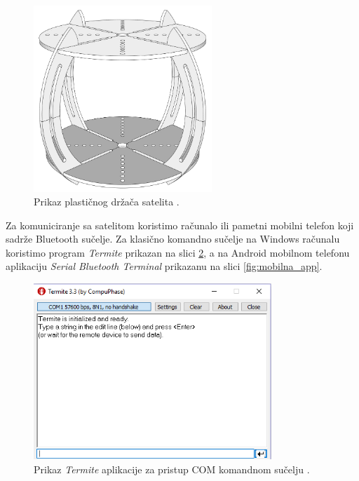 \documentclass[times, utf8, diplomski, numeric]{templates/template}
\begin{document}
{{        \begin{figure}[htb]
        \centering
        \includegraphics[width=0.6\textwidth]{images/drzac.png}
        \caption{Prikaz plastičnog držača satelita \cite{zracni_lezaj}.}
        \label{fig:drzac}
        \end{figure}

        Za komuniciranje sa satelitom koristimo računalo ili pametni mobilni telefon koji sadrže Bluetooth sučelje. Za klasično komandno sučelje na Windows računalu koristimo program \emph{Termite} \cite{termite} prikazan na slici \ref{fig:termite}, a na Android mobilnom telefonu aplikaciju \emph{Serial Bluetooth Terminal} \cite{mobilna_app} prikazanu na slici \ref{fig:mobilna_app}.

        \begin{figure}[htb]
        \centering
        \includegraphics[width=0.8\textwidth]{images/termite.png}
        \caption{Prikaz \emph{Termite} aplikacije za pristup COM komandnom sučelju \cite{termite}.}
        \label{fig:termite}
        \end{figure}

}}
\end{document}
